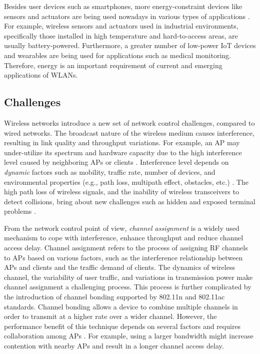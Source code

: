Besides user devices such as smartphones, more energy-constraint devices like sensors and actuators are being used nowadays in various types of applications \cite{Tozlu2012,CYW43907,BCM4343,S1-energy-MAC,REWIMO}.
For example, wireless sensors and actuators used in industrial environments, specifically those installed in high temperature and hard-to-access areas, are usually battery-powered. 
Furthermore, a greater number of low-power IoT devices and wearables are being used for applications such as medical monitoring.
Therefore, energy is an important requirement of current and emerging applications of WLANs.


\subsection{Challenges}
\label{motiv_chall}
%
Wireless networks introduce a new set of network control challenges, compared to wired networks.
The broadcast nature of the wireless medium causes interference, resulting in link quality and throughput variations.
For example, an AP may under-utilize its spectrum and hardware capacity due to the high interference level caused by neighboring APs or clients \cite{DenseWLAN1,decIntf,smog}.
Interference level depends on \textit{dynamic} factors such as mobility, traffic rate, number of devices, and environmental properties (e.g., path loss, multipath effect, obstacles, etc.) \cite{Pelechrinis2011,RSSIranging,largeScaleMeas,Dezfouli2014c}.
The high path loss of wireless signals, and the inability of wireless transceivers to detect collisions, bring about new challenges such as hidden and exposed terminal problems \cite{transOpp}.

From the network control point of view, \textit{channel assignment} is a widely used mechanism to cope with interference, enhance throughput and reduce channel access delay.
Channel assignment refers to the process of assigning RF channels to APs based on various factors, such as the interference relationship between APs and clients and the traffic demand of clients.
The dynamics of wireless channel, the variability of user traffic, and variations in transmission power make channel assignment a challenging process.
This process is further complicated by the introduction of channel bonding supported by 802.11n and 802.11ac standards.
Channel bonding allows a device to combine multiple channels in order to transmit at a higher rate over a wider channel.
However, the performance benefit of this technique depends on several factors and requires collaboration among APs \cite{deek2013joint,faridi2017analysis}.
For example, using a larger bandwidth might increase contention with nearby APs and result in a longer channel access delay.

